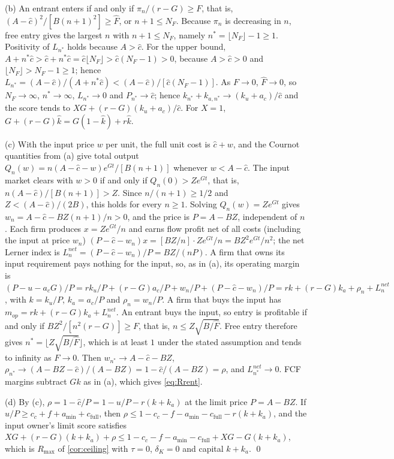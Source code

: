 (b) An entrant enters if and only if $\pi_n/(r-G)\ge F$, that is, $(A-\hat c)^2/[B(n+1)^2]\ge\hat F$, or $n+1\le N_F$. Because $\pi_n$ is decreasing in $n$, free entry gives the largest $n$ with $n+1\le N_F$, namely $n^*=\lfloor N_F\rfloor-1\ge 1$. Positivity of $L_{n^*}$ holds because $A>\hat c$. For the upper bound, $A+n^*\hat c>\hat c+n^*\hat c=\hat c\lfloor N_F\rfloor>\hat c(N_F-1)>0$, because $A>\hat c>0$ and $\lfloor N_F\rfloor>N_F-1\ge 1$; hence $L_{n^*}=(A-\hat c)/(A+n^*\hat c)<(A-\hat c)/[\hat c(N_F-1)]$. As $F\to 0$, $\hat F\to 0$, so $N_F\to\infty$, $n^*\to\infty$, $L_{n^*}\to 0$ and $P_{n^*}\to\hat c$; hence $k_{n^*}+k_{a,n^*}\to(k_u+a_c)/\hat c$ and the score tends to $XG+(r-G)(k_u+a_c)/\hat c$. For $X=1$, $G+(r-G)\hat k=G(1-\hat k)+r\hat k$.

(c) With the input price $w$ per unit, the full unit cost is $\hat c+w$, and the Cournot quantities from (a) give total output $Q_n(w)=n(A-\hat c-w)e^{Gt}/[B(n+1)]$ whenever $w<A-\hat c$. The input market clears with $w>0$ if and only if $Q_n(0)>Ze^{Gt}$, that is, $n(A-\hat c)/[B(n+1)]>Z$. Since $n/(n+1)\ge 1/2$ and $Z<(A-\hat c)/(2B)$, this holds for every $n\ge 1$. Solving $Q_n(w)=Ze^{Gt}$ gives $w_n=A-\hat c-BZ(n+1)/n>0$, and the price is $P=A-BZ$, independent of $n$. Each firm produces $x=Ze^{Gt}/n$ and earns flow profit net of all costs (including the input at price $w_n$) $(P-\hat c-w_n)x=[BZ/n]\cdot Ze^{Gt}/n=BZ^2e^{Gt}/n^2$; the net Lerner index is $L_n^{net}=(P-\hat c-w_n)/P=BZ/(nP)$. A firm that owns its input requirement pays nothing for the input, so, as in (a), its operating margin is $(P-u-a_cG)/P=rk_u/P+(r-G)a_c/P+w_n/P+(P-\hat c-w_n)/P=rk+(r-G)k_a+\rho_n+L_n^{net}$, with $k=k_u/P$, $k_a=a_c/P$ and $\rho_n=w_n/P$. A firm that buys the input has $m_{op}=rk+(r-G)k_a+L_n^{net}$. An entrant buys the input, so entry is profitable if and only if $BZ^2/[n^2(r-G)]\ge F$, that is, $n\le Z\sqrt{B/\hat F}$. Free entry therefore gives $n^*=\lfloor Z\sqrt{B/\hat F}\rfloor$, which is at least $1$ under the stated assumption and tends to infinity as $F\to 0$. Then $w_{n^*}\to A-\hat c-BZ$, $\rho_{n^*}\to(A-BZ-\hat c)/(A-BZ)=1-\hat c/(A-BZ)=\rho$, and $L_{n^*}^{net}\to 0$. FCF margins subtract $Gk$ as in (a), which gives \eqref{eq:Rrent}.

(d) By (c), $\rho=1-\hat c/P=1-u/P-r(k+k_a)$ at the limit price $P=A-BZ$. If $u/P\ge c_c+f+a_{\min}+c_{\mathrm{full}}$, then $\rho\le1-c_c-f-a_{\min}-c_{\mathrm{full}}-r(k+k_a)$, and the input owner's limit score satisfies $XG+(r-G)(k+k_a)+\rho\le1-c_c-f-a_{\min}-c_{\mathrm{full}}+XG-G(k+k_a)$, which is $R_{\max}$ of \autoref{cor:ceiling} with $\tau=0$, $\delta_K=0$ and capital $k+k_a$. \qed

